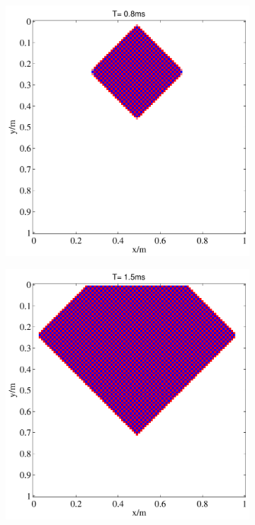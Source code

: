 \begin{figure}[htb!]
\centering
    \begin{subfigure}[b]{0.45\textwidth}
        \centering
        \includegraphics[width=\textwidth]{figures/courandt_1.pdf}
        \caption{}
    \end{subfigure}
    \hfill
    \begin{subfigure}[b]{0.45\textwidth}
        \centering
        \includegraphics[width=\textwidth]{figures/courandt_2.pdf}

\end{subfigure}
\end{figure}
